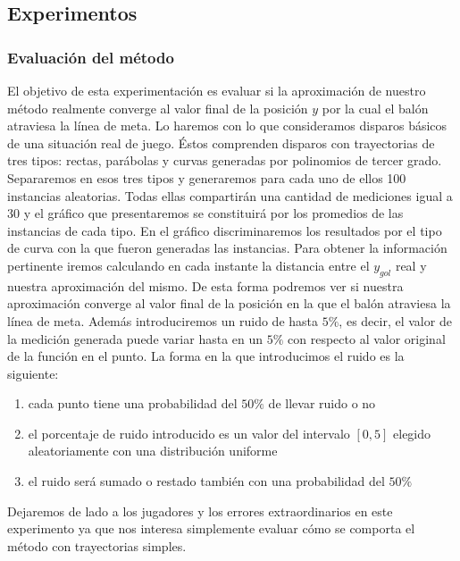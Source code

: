 \subsection{Experimentos}

\subsubsection{Evaluación del método}
El objetivo de esta experimentación es evaluar si la aproximación de nuestro método realmente converge al valor final de 
la posición $y$ por la cual el balón atraviesa la línea de meta. Lo haremos con lo que consideramos disparos básicos de una situación
real de juego. Éstos comprenden disparos con trayectorias de tres tipos: rectas, parábolas y curvas generadas por polinomios de tercer
grado. Separaremos en esos tres tipos y generaremos para cada uno de ellos 100 instancias aleatorias. Todas ellas compartirán 
una cantidad de mediciones igual a 30 y el gráfico que presentaremos se constituirá por los promedios de las instancias de cada tipo.
En el gráfico discriminaremos los resultados por el tipo de curva con la que fueron generadas las instancias. 
Para obtener la información pertinente iremos calculando en cada instante la distancia entre 
el $y_{gol}$ real y nuestra aproximación del mismo. De esta forma podremos ver si nuestra aproximación converge al valor final de 
la posición en la que el balón atraviesa la línea de meta.
Además introduciremos un ruido de hasta $5\%$, es decir, el valor de la medición generada puede variar hasta en un $5\%$ con 
respecto al valor original de la función en el punto. La forma en la que introducimos el ruido es la siguiente:
\begin{enumerate}
	\item cada punto tiene una probabilidad del $50\%$ de llevar ruido o no
	\item el porcentaje de ruido introducido es un valor del intervalo $[0, 5]$ elegido aleatoriamente con una distribución uniforme
	\item el ruido será sumado o restado también con una probabilidad del $50\%$
\end{enumerate}
Dejaremos de lado a los jugadores y los errores extraordinarios en este experimento ya que nos interesa simplemente evaluar cómo se 
comporta el método con trayectorias simples.  

